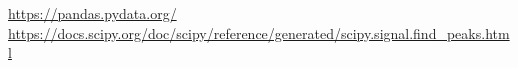\documentclass{article}
\begin{document}
\newpage



\begin{thebibliography}{1.7} 
	\url{https://pandas.pydata.org/}
	\url{https://docs.scipy.org/doc/scipy/reference/generated/scipy.signal.find_peaks.html}
\end{thebibliography}
\end{document}
